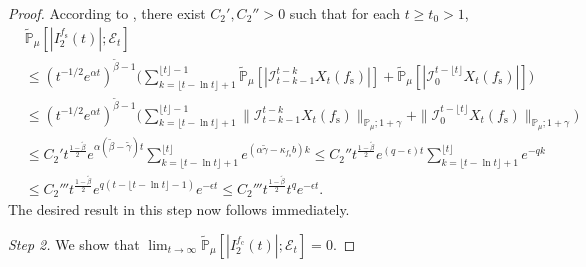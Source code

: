 \documentclass[12pt,a4paper]{amsart}
\theoremstyle{plain}
\theoremstyle{definition}
\numberwithin{equation}{section}
\begin{document}
\begin{proof}
	According to \cite[Lemma 2.13]{RenSongSunZhao2019Stable}, there exist $C_2',C_2''>0$ such that for each $t\geq t_0 >1$,
  \begin{align}
    & \mathbb{\widetilde{P}}_{\mu} [ |I^{f_\mathrm s}_2(t)|;\mathcal{E}_t] \\
    & \leq  ( t^{-1/2}e^{\alpha t} )^{\tilde \beta - 1}\Big(\sum_{k=\lfloor t-\ln t \rfloor+1}^{\lfloor t \rfloor - 1}\mathbb{\widetilde{P}}_{\mu} [| \mathcal{I}_{t-k-1}^{t-k} X_t(f_\mathrm s) |] + \mathbb{\widetilde{P}}_{\mu}[| \mathcal{I}_{0}^{t-\lfloor t\rfloor} X_t(f_\mathrm s)|]\Big) \\
    & \leq  ( t^{-1/2}e^{\alpha t} )^{\tilde \beta - 1}\Big(\sum_{k=\lfloor t-\ln t \rfloor+1}^{\lfloor t \rfloor - 1}\|\mathcal{I}_{t-k-1}^{t-k} X_t(f_\mathrm s) \|_{\mathbb P_\mu; 1+\gamma} + \|\mathcal I_0^{t-\lfloor t \rfloor} X_t(f_\mathrm s)\|_{\mathbb P_\mu;1+\gamma}\Big) \\
    & \leq C_2't^{\frac{1-\tilde{\beta}}{2}} e^{\alpha (\tilde \beta - \tilde \gamma)t}\sum_{k=\lfloor t-\ln t \rfloor+1}^{\lfloor t \rfloor}  e^{(\alpha\tilde \gamma-\kappa_{f_\mathrm s} b)k}
      \leq C_2''t^{\frac{1-\tilde{\beta}}{2}} e^{(q-\epsilon) t}\sum_{k=\lfloor t-\ln t \rfloor+1}^{\lfloor t \rfloor}  e^{-q k}
    \\ & \leq C_2'''t^{\frac{1-\tilde{\beta}}{2}} e^{q(t - \lfloor t - \ln t\rfloor-1)}e^{-\epsilon t}
         \leq C_2'''t^{\frac{1-\tilde{\beta}}{2}} t^q e^{- \epsilon t}.
  \end{align}
The desired result in this step now follows immediately.

\emph{Step 2.} We show that $\lim_{t\rightarrow \infty}\widetilde{\mathbb P}_{\mu}[|I^{f_\mathrm c}_2(t)|;\mathcal{E}_t]=0$.


\end{proof}
\end{document}
